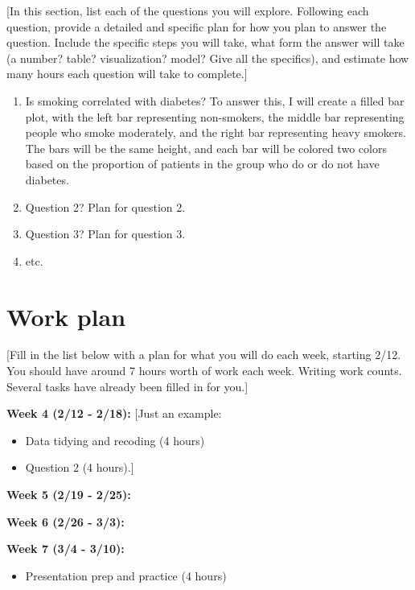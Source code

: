 \documentclass[
  letterpaper,
  DIV=11,
  numbers=noendperiod]{scrartcl}
\providecommand{\tightlist}{%
  \setlength{\itemsep}{0pt}\setlength{\parskip}{0pt}}\usepackage{longtable,booktabs,array}
\begin{document}
{[}In this section, list each of the questions you will explore.
Following each question, provide a detailed and specific plan for how
you plan to answer the question. Include the specific steps you will
take, what form the answer will take (a number? table? visualization?
model? Give all the specifics), and estimate how many hours each
question will take to complete.{]}

\begin{enumerate}
\def\labelenumi{\arabic{enumi}.}
\item
  Is smoking correlated with diabetes? To answer this, I will create a
  filled bar plot, with the left bar representing non-smokers, the
  middle bar representing people who smoke moderately, and the right bar
  representing heavy smokers. The bars will be the same height, and each
  bar will be colored two colors based on the proportion of patients in
  the group who do or do not have diabetes.
\item
  Question 2? Plan for question 2.
\item
  Question 3? Plan for question 3.
\item
  etc.
\end{enumerate}

\section{Work plan}\label{work-plan}

{[}Fill in the list below with a plan for what you will do each week,
starting 2/12. You should have around 7 hours worth of work each week.
Writing work counts. Several tasks have already been filled in for
you.{]}

\textbf{Week 4 (2/12 - 2/18):} {[}Just an example:

\begin{itemize}
\tightlist
\item
  Data tidying and recoding (4 hours)
\item
  Question 2 (4 hours).{]}
\end{itemize}

\textbf{Week 5 (2/19 - 2/25):}

\textbf{Week 6 (2/26 - 3/3):}

\textbf{Week 7 (3/4 - 3/10):}

\begin{itemize}
\tightlist
\item
  Presentation prep and practice (4 hours)
\end{itemize}
\end{document}
